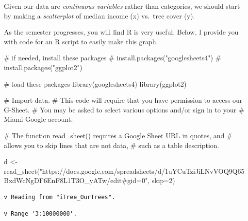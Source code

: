 \documentclass[
  letterpaper,
  DIV=11,
  numbers=noendperiod]{scrreprt}
\newenvironment{Shaded}{\begin{snugshade}}{\end{snugshade}}
\newcommand{\AttributeTok}[1]{\textcolor[rgb]{0.40,0.45,0.13}{#1}}
\newcommand{\CommentTok}[1]{\textcolor[rgb]{0.37,0.37,0.37}{#1}}
\newcommand{\DecValTok}[1]{\textcolor[rgb]{0.68,0.00,0.00}{#1}}
\newcommand{\FunctionTok}[1]{\textcolor[rgb]{0.28,0.35,0.67}{#1}}
\newcommand{\NormalTok}[1]{\textcolor[rgb]{0.00,0.23,0.31}{#1}}
\newcommand{\OtherTok}[1]{\textcolor[rgb]{0.00,0.23,0.31}{#1}}
\newcommand{\StringTok}[1]{\textcolor[rgb]{0.13,0.47,0.30}{#1}}
\begin{document}
Given our data are \emph{continuous variables} rather than categories,
we should start by making a \emph{scatterplot} of median income (x)
vs.~tree cover (y).

As the semester progresses, you will find R is very useful. Below, I
provide you with code for an R script to easily make this graph.

\begin{Shaded}
\begin{Highlighting}[]
\CommentTok{\# if needed, install these packages}
\CommentTok{\# install.packages("googlesheets4")}
\CommentTok{\# install.packages("ggplot2")}

\CommentTok{\# load these packages}
\FunctionTok{library}\NormalTok{(googlesheets4)}
\FunctionTok{library}\NormalTok{(ggplot2)}

\CommentTok{\# Import data. }
\CommentTok{\# This code will require that you have permission to access our G{-}Sheet.}
\CommentTok{\# You may be asked to select various options and/or sign in to your}
\CommentTok{\# Miami Google account.}

\CommentTok{\# The function read\_sheet() requires a Google Sheet URL in quotes, and}
\CommentTok{\# allows you to skip lines that are not data, }
\CommentTok{\# such as a table description.}

\NormalTok{d }\OtherTok{\textless{}{-}} \FunctionTok{read\_sheet}\NormalTok{(}\StringTok{"https://docs.google.com/spreadsheets/d/1uYCuTziJiLNvVOQ9Q65BxdWcNgDF6EnF8L1T3O\_yATw/edit\#gid=0"}\NormalTok{,}
                \AttributeTok{skip=}\DecValTok{2}\NormalTok{)}
\end{Highlighting}
\end{Shaded}

\begin{verbatim}
v Reading from "iTree_OurTrees".
\end{verbatim}

\begin{verbatim}
v Range '3:10000000'.
\end{verbatim}
\end{document}
